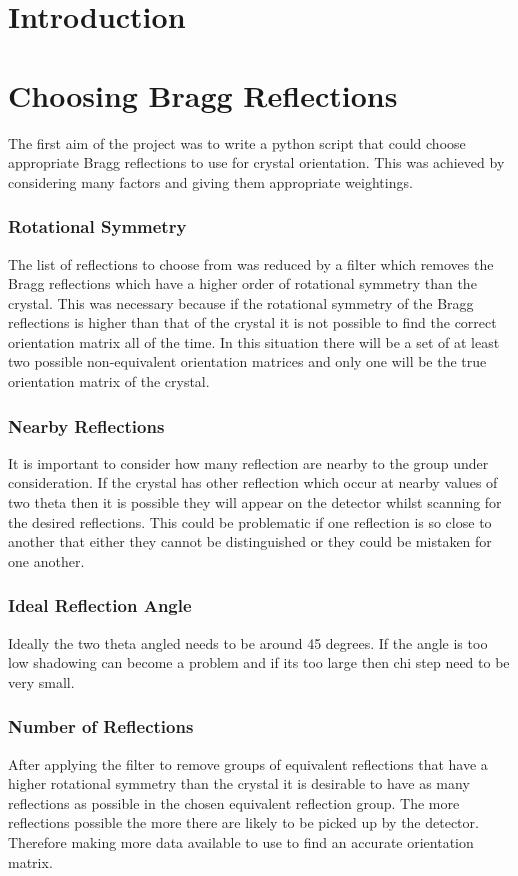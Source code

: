\documentclass[10pt,a4paper]{article}
\begin{document}
\begin{multicols}{2}
\section*{Introduction}

\section*{Choosing Bragg Reflections}
The first aim of the project was to write a python script that could choose appropriate Bragg reflections to use for crystal orientation. This was achieved 
by considering many factors and giving them appropriate weightings.
\subsubsection*{Rotational Symmetry}
The list of reflections to choose from was reduced by a filter which removes the Bragg reflections which have a higher order of rotational symmetry than the
 crystal. This was necessary because if the rotational symmetry of the Bragg reflections is higher than that of the crystal it is not possible to find 
 the correct orientation matrix all of the time. In this situation there will be a set of at least two possible non-equivalent orientation matrices and only
one will be the true orientation matrix of the crystal. 
\subsubsection*{Nearby Reflections}
It is important to consider how many reflection are nearby to the group under consideration. If the crystal has other reflection which occur at nearby
 values of two theta then it is possible they will appear on the detector whilst scanning for the desired reflections. This could be problematic if one
 reflection is so close to another that either they cannot be distinguished or they could be mistaken for one another.
\subsubsection*{Ideal Reflection Angle}
Ideally the two theta angled needs to be around 45 degrees. If the angle is too low shadowing can become a problem %
and if its too large then chi step need to be very small. %
\subsubsection*{Number of Reflections}
After applying the filter to remove groups of equivalent reflections that have a higher rotational symmetry than the crystal it is desirable to have as many 
reflections as possible in the chosen equivalent reflection group. The more reflections possible the more there are likely to be picked up by the detector. Therefore making more data available to use to find an accurate orientation matrix.

\end{multicols}
\end{document}
